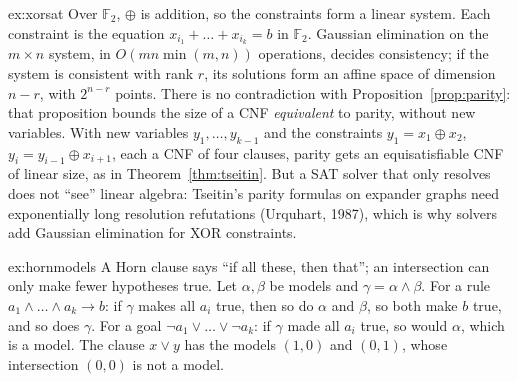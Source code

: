 \begin{solution}{ex:xorsat}
\idea Over $\mathbb F_2$, $\oplus$ is addition, so the constraints form a linear system.
\writeup Each constraint is the equation $x_{i_1}+\dots+x_{i_k}=b$ in $\mathbb F_2$. Gaussian elimination on the $m\times n$ system, in $O(mn\min(m,n))$
operations, decides consistency; if the system is consistent with rank $r$, its solutions form an affine space of
dimension $n-r$, with $2^{n-r}$ points. There is no contradiction with Proposition~\ref{prop:parity}: that proposition bounds the
size of a CNF \emph{equivalent} to parity, without new variables. With new variables $y_1,\dots,y_{k-1}$ and the constraints
$y_1=x_1\oplus x_2$, $y_{i}=y_{i-1}\oplus x_{i+1}$, each a CNF of four clauses, parity gets an equisatisfiable CNF of linear size, as in
Theorem~\ref{thm:tseitin}. But a SAT solver that only resolves does not ``see'' linear algebra: Tseitin's parity formulas on
expander graphs need exponentially long resolution refutations (Urquhart, 1987), which is why solvers add Gaussian
elimination for XOR constraints.
\end{solution}

\begin{solution}{ex:hornmodels}
\idea A Horn clause says ``if all these, then that''; an intersection can only make fewer hypotheses true.
\writeup Let $\alpha,\beta$ be models and $\gamma=\alpha\land\beta$. For a rule $a_1\land\dots\land a_k\to b$: if $\gamma$ makes all $a_i$ true, then so do $\alpha$ and $\beta$, so both make $b$
true, and so does $\gamma$. For a goal $\neg a_1\lor\dots\lor\neg a_k$: if $\gamma$ made all $a_i$ true, so would $\alpha$, which is a model. The clause
$x\lor y$ has the models $(1,0)$ and $(0,1)$, whose intersection $(0,0)$ is not a model.
\end{solution}

